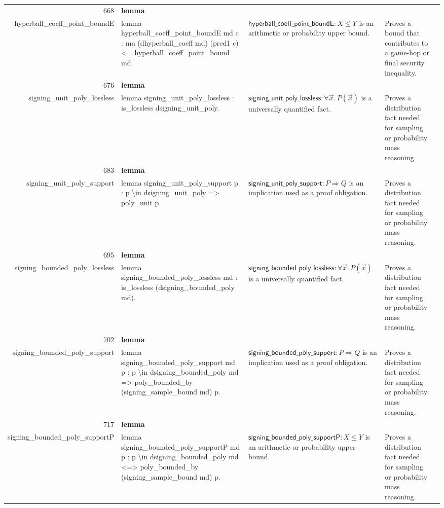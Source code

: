 \documentclass[10pt]{article}
\newcommand{\ec}[1]{\begingroup\ttfamily\scriptsize #1\endgroup}
\begin{document}
\begin{longtable}{r L{0.17\textwidth} L{0.26\textwidth} L{0.27\textwidth} L{0.20\textwidth}}
668 & \textbf{lemma}\\\ec{hyperball\_coeff\_point\_boundE} & \ec{lemma hyperball\_coeff\_point\_boundE md c : mu (dhyperball\_coeff md) (pred1 c) <= hyperball\_coeff\_point\_bound md.} & \(\mathsf{hyperball\_coeff\_point\_boundE} : X \le Y\) is an arithmetic or probability upper bound. & Proves a bound that contributes to a game-hop or final security inequality. \\
676 & \textbf{lemma}\\\ec{signing\_unit\_poly\_lossless} & \ec{lemma signing\_unit\_poly\_lossless : is\_lossless dsigning\_unit\_poly.} & \(\mathsf{signing\_unit\_poly\_lossless} : \forall \vec{x}.\, P(\vec{x})\) is a universally quantified fact. & Proves a distribution fact needed for sampling or probability mass reasoning. \\
683 & \textbf{lemma}\\\ec{signing\_unit\_poly\_support} & \ec{lemma signing\_unit\_poly\_support p : p \textbackslash{}in dsigning\_unit\_poly => poly\_unit p.} & \(\mathsf{signing\_unit\_poly\_support} : P \Rightarrow Q\) is an implication used as a proof obligation. & Proves a distribution fact needed for sampling or probability mass reasoning. \\
695 & \textbf{lemma}\\\ec{signing\_bounded\_poly\_lossless} & \ec{lemma signing\_bounded\_poly\_lossless md : is\_lossless (dsigning\_bounded\_poly md).} & \(\mathsf{signing\_bounded\_poly\_lossless} : \forall \vec{x}.\, P(\vec{x})\) is a universally quantified fact. & Proves a distribution fact needed for sampling or probability mass reasoning. \\
702 & \textbf{lemma}\\\ec{signing\_bounded\_poly\_support} & \ec{lemma signing\_bounded\_poly\_support md p : p \textbackslash{}in dsigning\_bounded\_poly md => poly\_bounded\_by (signing\_sample\_bound md) p.} & \(\mathsf{signing\_bounded\_poly\_support} : P \Rightarrow Q\) is an implication used as a proof obligation. & Proves a distribution fact needed for sampling or probability mass reasoning. \\
717 & \textbf{lemma}\\\ec{signing\_bounded\_poly\_supportP} & \ec{lemma signing\_bounded\_poly\_supportP md p : p \textbackslash{}in dsigning\_bounded\_poly md <=> poly\_bounded\_by (signing\_sample\_bound md) p.} & \(\mathsf{signing\_bounded\_poly\_supportP} : X \le Y\) is an arithmetic or probability upper bound. & Proves a distribution fact needed for sampling or probability mass reasoning. \\

\end{longtable}
\end{document}
